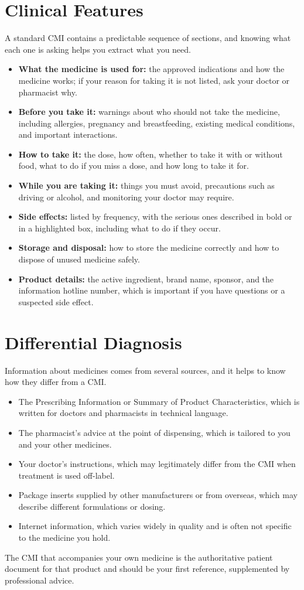 \section*{Clinical Features}
A standard CMI contains a predictable sequence of sections, and knowing what each one is asking helps you extract what you need.
\begin{itemize}
    \item \textbf{What the medicine is used for:} the approved indications and how the medicine works; if your reason for taking it is not listed, ask your doctor or pharmacist why.
    \item \textbf{Before you take it:} warnings about who should not take the medicine, including allergies, pregnancy and breastfeeding, existing medical conditions, and important interactions.
    \item \textbf{How to take it:} the dose, how often, whether to take it with or without food, what to do if you miss a dose, and how long to take it for.
    \item \textbf{While you are taking it:} things you must avoid, precautions such as driving or alcohol, and monitoring your doctor may require.
    \item \textbf{Side effects:} listed by frequency, with the serious ones described in bold or in a highlighted box, including what to do if they occur.
    \item \textbf{Storage and disposal:} how to store the medicine correctly and how to dispose of unused medicine safely.
    \item \textbf{Product details:} the active ingredient, brand name, sponsor, and the information hotline number, which is important if you have questions or a suspected side effect.
\end{itemize}

\section*{Differential Diagnosis}
Information about medicines comes from several sources, and it helps to know how they differ from a CMI.
\begin{itemize}
    \item The Prescribing Information or Summary of Product Characteristics, which is written for doctors and pharmacists in technical language.
    \item The pharmacist's advice at the point of dispensing, which is tailored to you and your other medicines.
    \item Your doctor's instructions, which may legitimately differ from the CMI when treatment is used off-label.
    \item Package inserts supplied by other manufacturers or from overseas, which may describe different formulations or dosing.
    \item Internet information, which varies widely in quality and is often not specific to the medicine you hold.
\end{itemize}
The CMI that accompanies your own medicine is the authoritative patient document for that product and should be your first reference, supplemented by professional advice.

